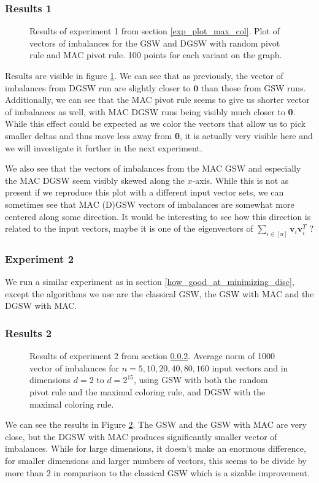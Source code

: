 \documentclass[12pt]{article}
\begin{document}
\subsubsection{Results 1}
\begin{figure}[h!]
\centering

\caption{Results of experiment 1 from section \ref{exp_plot_max_col}. Plot of vectors of imbalances for the GSW and DGSW with random pivot rule and MAC pivot rule. 100 points for each variant on the graph.}
\label{results_plot_max_col}
\end{figure}
Results are visible in figure \ref{results_plot_max_col}. We can see that as previously, the vector of imbalances from DGSW run are slightly closer to $\textbf{0}$ than those from GSW runs. Additionally, we can see that the MAC pivot rule seems to give us shorter vector of imbalances as well, with MAC DGSW runs being visibly much closer to \textbf{0}. While this effect could be expected as we color the vectors that allow us to pick smaller deltas and thus move less away from \textbf{0}, it is actually very visible here and we will investigate it further in the next experiment.

We also see that the vectors of imbalances from the MAC GSW and especially the MAC DGSW seem visibly skewed along the $x$-axis. While this is not as present if we reproduce this plot with a different input vector sets, we can sometimes see that MAC (D)GSW vectors of imbalances are somewhat more centered along some direction. It would be interesting to see how this direction is related to the input vectors, maybe it is one of the eigenvectors of $\sum_{i\in[n]}\textbf{v}_i\textbf{v}_i^T$ ?

\subsubsection{Experiment 2}\label{exp_norms_max_col}
We run a similar experiment as in section \ref{how_good_at_minimizing_disc}, except the algorithms we use are the classical GSW, the GSW with MAC and the DGSW with MAC.
\subsubsection{Results 2}
\begin{figure}[h!]
\centering

\caption{Results of experiment 2 from section \ref{exp_norms_max_col}. Average norm of 1000 vector of imbalances for $n=5,10,20,40,80,160$ input vectors and in dimensions $d=2$ to $d=2^{15}$, using GSW with both the random pivot rule and the maximal coloring rule, and DGSW with the maximal coloring rule.}
\label{results_plot_max_col_norms}
\end{figure}
We can see the results in Figure \ref{results_plot_max_col_norms}. The GSW and the GSW with MAC are very close, but the DGSW with MAC produces significantly smaller vector of imbalances. While for large dimensions, it doesn't make an enormous difference, for smaller dimensions and larger numbers of vectors, this seems to be divide by more than 2 in comparison to the classical GSW which is a sizable improvement.
\end{document}
